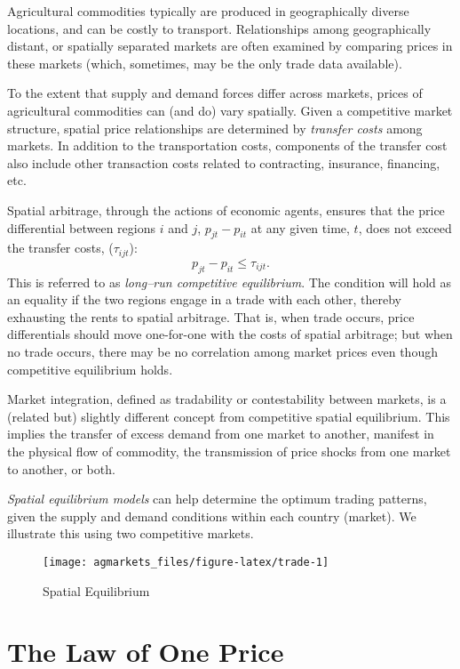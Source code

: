 \documentclass[
]{book}
\begin{document}
Agricultural commodities typically are produced in geographically diverse locations, and can be costly to transport. Relationships among geographically distant, or spatially separated markets are often examined by comparing prices in these markets (which, sometimes, may be the only trade data available).

To the extent that supply and demand forces differ across markets, prices of agricultural commodities can (and do) vary spatially. Given a competitive market structure, spatial price relationships are determined by \emph{transfer costs} among markets. In addition to the transportation costs, components of the transfer cost also include other transaction costs related to contracting, insurance, financing, etc.

Spatial arbitrage, through the actions of economic agents, ensures that the price differential between regions \(i\) and \(j\), \(p_{jt}-p_{it}\) at any given time, \(t\), does not exceed the transfer costs, (\(\tau_{ijt}\)): \[p_{jt}-p_{it} \le \tau_{ijt}.\] This is referred to as \emph{long--run competitive equilibrium}. The condition will hold as an equality if the two regions engage in a trade with each other, thereby exhausting the rents to spatial arbitrage. That is, when trade occurs, price differentials should move one-for-one with the costs of spatial arbitrage; but when no trade occurs, there may be no correlation among market prices even though competitive equilibrium holds.

Market integration, defined as tradability or contestability between markets, is a (related but) slightly different concept from competitive spatial equilibrium. This implies the transfer of excess demand from one market to another, manifest
in the physical flow of commodity, the transmission of price shocks from one market to another, or both.

\emph{Spatial equilibrium models} can help determine the optimum trading patterns, given the supply and demand conditions within each country (market). We illustrate this using two competitive markets.

\begin{figure}

{\centering \texttt{[image: agmarkets\_files/figure-latex/trade-1]} 

}

\caption{Spatial Equilibrium}\label{fig:trade}
\end{figure}

\hypertarget{the-law-of-one-price}{%
\section{The Law of One Price}\label{the-law-of-one-price}}
\end{document}
